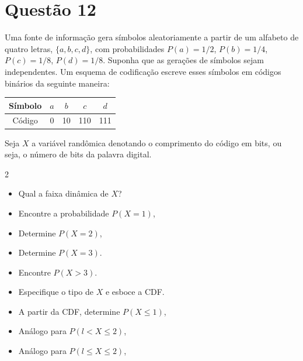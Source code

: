 \section{Questão 12}
Uma fonte de informação gera símbolos aleatoriamente a partir de um alfabeto de quatro letras,
$\{a, b, c, d\}$,
com probabilidades 
$P(a) = 1/2$, 
$P(b) = 1/4$, 
$P(c) = 1/8$, 
$P(d) = 1/8$.
%
Suponha que as gerações de símbolos sejam independentes. 
Um esquema de codificação escreve esses símbolos em códigos binários da seguinte maneira:
%
\begin{table}[htbp!]
    \centering
    \begin{tabular}{c| cccc}
    \toprule
        Símbolo & $a$ & $b$ & $c$ & $d$ \\
    \midrule
        Código & 0 & 10 & 110 & 111 \\
    \bottomrule
    \end{tabular}
\end{table}

Seja $X$ a variável randômica denotando o comprimento do código em bits, ou seja, o número de bits da palavra digital.

\begin{multicols}{2}
\begin{itemize}
    \item [a)] Qual a faixa dinâmica de $X$?
    \item [b)] Encontre a probabilidade $P(X = 1)$,
    \item [c)] Determine $P(X = 2)$,
    \item [d)] Determine $P(X = 3)$.
    \item [e)] Encontre $P(X > 3)$.
    \item [f)] Especifique o tipo de $X$ e esboce a CDF.
    \item [g)] A partir da CDF, determine $P(X \leq 1)$,
    \item [h)] Análogo para $P(l < X \leq 2)$,
    \item [i)] Análogo para $P(l \leq X \leq 2)$, 
\end{itemize}
\end{multicols}

\respostas


